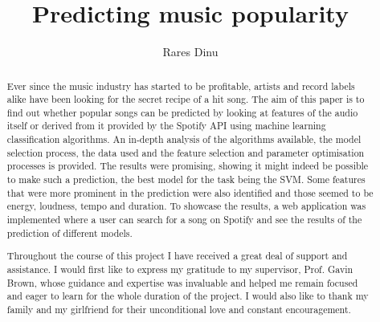 \documentclass[a4paper, twoside, 12pt]{report}
\title{Predicting music popularity}
\author{Rares Dinu}
\begin{document}


\begin{abstract}
Ever since the music industry has started to be profitable, artists and record labels alike have been looking for the secret recipe of a hit song. The aim of this paper is to find out whether popular songs can be predicted by looking at features of the audio itself or derived from it provided by the Spotify API using machine learning classification algorithms. An in-depth analysis of the algorithms available, the model selection process, the data used and the feature selection and parameter optimisation processes is provided. The results were promising, showing it might indeed be possible to make such a prediction, the best model for the task being the SVM. Some features that were more prominent in the prediction were also identified and those seemed to be energy, loudness, tempo and duration. To showcase the results, a web application was implemented where a user can search for a song on Spotify and see the results of the prediction of different models.
\end{abstract}

\renewcommand{\abstractname}{Acknowledgements}
\begin{abstract}
Throughout the course of this project I have received a great deal of support and assistance. I would first like to express my gratitude to my supervisor, Prof. Gavin Brown, whose guidance and expertise was invaluable and helped me remain focused and eager to learn for the whole duration of the project. I would also like to thank my family and my girlfriend for their unconditional love and constant encouragement.
\end{abstract}

\tableofcontents
\listoffigures
\listoftables

%





%





\end{document}
